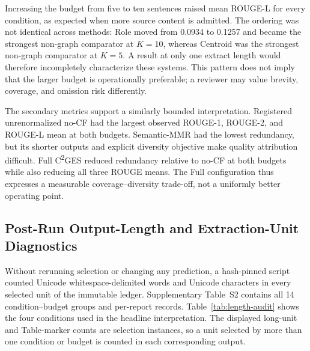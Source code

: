 \documentclass[applsci,article,submit,moreauthors]{Definitions/mdpi}
\newcommand{\cges}{C\textsuperscript{2}GES}
\begin{document}
Increasing the budget from five to ten sentences raised mean ROUGE-L for every condition, as expected when more source content is admitted. The ordering was not identical across methods: Role moved from 0.0934 to 0.1257 and became the strongest non-graph comparator at $K=10$, whereas Centroid was the strongest non-graph comparator at $K=5$. A result at only one extract length would therefore incompletely characterize these systems. This pattern does not imply that the larger budget is operationally preferable; a reviewer may value brevity, coverage, and omission risk differently.

The secondary metrics support a similarly bounded interpretation. Registered unrenormalized no-CF had the largest observed ROUGE-1, ROUGE-2, and ROUGE-L mean at both budgets. Semantic-MMR had the lowest redundancy, but its shorter outputs and explicit diversity objective make quality attribution difficult. Full \cges{} reduced redundancy relative to no-CF at both budgets while also reducing all three ROUGE means. The Full configuration thus expresses a measurable coverage--diversity trade-off, not a uniformly better operating point.

\subsection{Post-Run Output-Length and Extraction-Unit Diagnostics}

Without rerunning selection or changing any prediction, a hash-pinned script counted Unicode whitespace-delimited words and Unicode characters in every selected unit of the immutable ledger. Supplementary Table~S2 contains all 14 condition--budget groups and per-report records. Table~\ref{tab:length-audit} shows the four conditions used in the headline interpretation. The displayed long-unit and Table-marker counts are selection instances, so a unit selected by more than one condition or budget is counted in each corresponding output.
\end{document}
